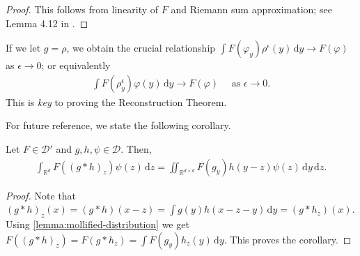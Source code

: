\begin{proof}
    This follows from linearity of \(F\) and Riemann sum approximation; see Lemma 4.12 in \cite{JanKristensenDistribution}.
\end{proof}

If we let \(g = \rho\), we obtain the crucial relationship \(\int F(\varphi_y)\rho^{\epsilon}(y) \, \mathrm{d}y \to F(\varphi)\) as \(\epsilon \to 0\); or equivalently
\begin{align}\label{eq:starting-point}
    \int F(\rho_y^\epsilon) \varphi(y)\, \mathrm{d}y \to F(\varphi) \quad \text{ as } \epsilon \to 0.
\end{align}
This is \emph{key} to proving the Reconstruction Theorem. 

For future reference, we state the following corollary.
\begin{corollary}\label{cor:minosokoad}
    Let \(F \in \mathcal{D}'\) and \(g,h, \psi \in \mathcal{D}\). Then, 
    \begin{align*}
        \int_{\mathbb{R}^d} F((g*h)_z) \psi(z)\, \mathrm{d}z
    = \iint_{\mathbb{R}^{d \times d}} F(g_y)  h(y-z) \psi(z) \, \mathrm{d}y\, \mathrm{d}z.
    \end{align*}
\end{corollary}

\begin{proof}
    Note that \((g*h)_z(x) = (g*h)(x - z) = \int g(y)h(x-z-y) \, \mathrm{d}y = (g*h_z)(x)\). Using \eqref{lemma:mollified-distribution} we get \(F((g*h)_z) = F(g*h_z) = \int F(g_y) h_z(y) \, \mathrm{d}y\). This proves the corollary.
\end{proof}
